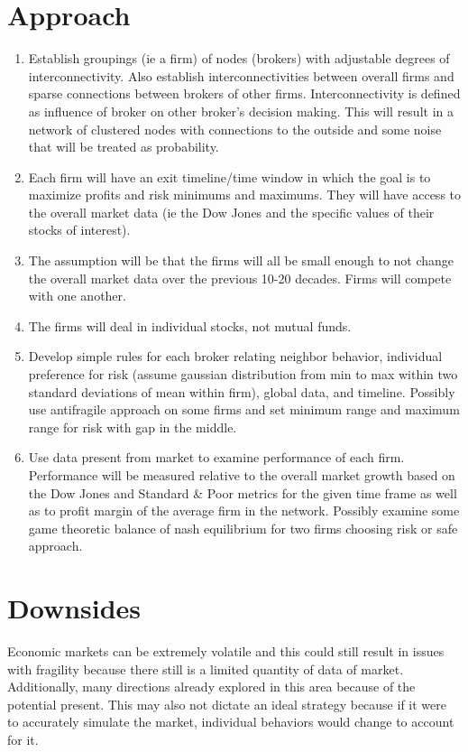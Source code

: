 \documentclass[letterpaper, 10 pt, proceedings]{ieeetran}  %
\begin{document}
\section{Approach}
\begin{enumerate}
\item Establish groupings (ie a firm) of nodes (brokers) with adjustable degrees of interconnectivity. Also establish interconnectivities between overall firms and sparse connections between brokers of other firms. Interconnectivity is defined as influence of broker on other broker's decision making. This will result in a network of clustered nodes with connections to the outside and some noise that will be treated as probability.
\item Each firm will have an exit timeline/time window in which the goal is to maximize profits and risk minimums and maximums. They will have access to the overall market data (ie the Dow Jones and the specific values of their stocks of interest).
\item The assumption will be that the firms will all be small enough to not change the overall market data over the previous 10-20 decades. Firms will compete with one another.
\item The firms will deal in individual stocks, not mutual funds.
\item Develop simple rules for each broker relating neighbor behavior, individual preference for risk (assume gaussian distribution from min to max within two standard deviations of mean within firm), global data, and timeline. Possibly use antifragile approach on some firms and set minimum range and maximum range for risk with gap in the middle.
\item Use data present from market to examine performance of each firm. Performance will be measured relative to the overall market growth based on the Dow Jones and Standard \& Poor metrics for the given time frame as well as to profit margin of the average firm in the network. Possibly examine some game theoretic balance of nash equilibrium for two firms choosing risk or safe approach.
\end{enumerate}
	
\section{Downsides}
Economic markets can be extremely volatile and this could still result in issues with fragility because there still is a limited quantity of data of market. Additionally, many directions already explored in this area because of the potential present. This may also not dictate an ideal strategy because if it were to accurately simulate the market, individual behaviors would change to account for it.
\end{document}
